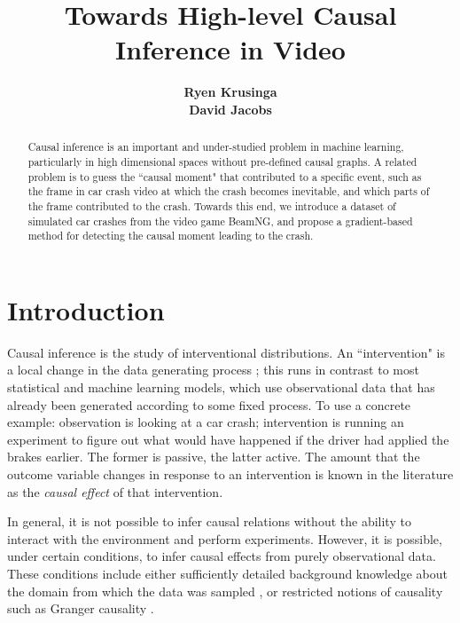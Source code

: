 \documentclass[letterpaper]{article} %
\title{Towards High-level Causal Inference in Video}
\author{
\Large \textbf{Ryen Krusinga} \\
\Large \textbf{David Jacobs}
}
\begin{document}
\maketitle

\begin{abstract}
Causal inference is an important and under-studied problem in machine learning, particularly in high dimensional spaces without pre-defined causal graphs. A related problem is to guess the ``causal moment" that contributed to a specific event, such as the frame in car crash video at which the crash becomes inevitable, and which parts of the frame contributed to the crash. Towards this end, we introduce a dataset of simulated car crashes from the video game BeamNG, and propose a gradient-based method for detecting the causal moment leading to the crash.
\end{abstract}

\section{Introduction}
\noindent Causal inference is the study of interventional distributions. An ``intervention" is a local change in the data generating process \cite{pearl2009causal}; this runs in contrast to most statistical and machine learning models, which use observational data that has already been generated according to some fixed process. To use a concrete example: observation is looking at a car crash; intervention is running an experiment to figure out what would have happened if the driver had applied the brakes earlier. The former is passive, the latter active. The amount that the outcome variable changes in response to an intervention is known in the literature as the \emph{causal effect} of that intervention.

In general, it is not possible to infer causal relations without the ability to interact with the environment and perform experiments. However, it is possible, under certain conditions, to infer causal effects from purely observational data. These conditions include either sufficiently detailed background knowledge about the domain from which the data was sampled \cite{pearl2009causal} \cite{rosenbaum1983central}, or restricted notions of causality such as Granger causality \cite{granger1969investigating} \cite{granger1980testing}.
\end{document}
